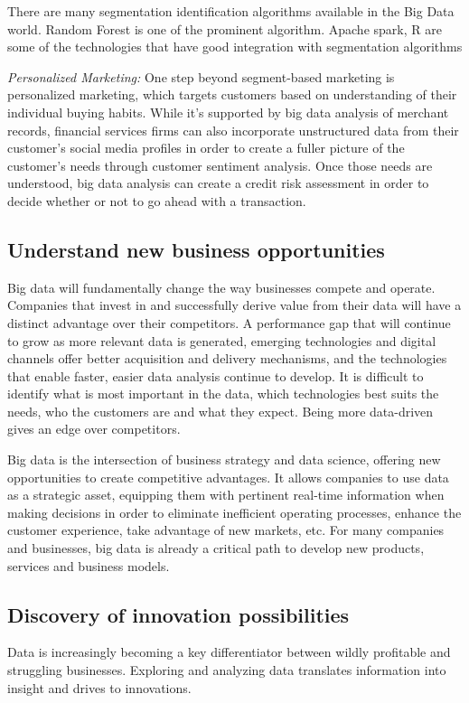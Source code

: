 \documentclass[sigconf]{acmart}
\begin{document}
There are many segmentation identification algorithms available in the Big Data world.  Random Forest is one of the prominent algorithm. Apache spark, R are some of the technologies that have good integration with segmentation algorithms

\textit{Personalized Marketing:} One step beyond segment-based marketing is personalized marketing, which targets customers based on understanding of their individual buying habits. While it's supported by big data analysis of merchant records, financial services firms can also incorporate unstructured data from their customer's social media profiles in order to create a fuller picture of the customer's needs through customer sentiment analysis. Once those needs are understood, big data analysis can create a credit risk assessment in order to decide whether or not to go ahead with a transaction\cite{5-big-data-use-cases-in-banking-and-financial-services}.

    
\subsection{Understand new business opportunities}
Big data will fundamentally change the way businesses
compete and operate. Companies that invest in and
successfully derive value from their data will have a distinct advantage over their competitors. A performance gap that will continue to grow as more relevant data is generated, emerging technologies and digital channels offer better acquisition and delivery mechanisms, and the technologies that enable faster, easier data analysis continue to develop. It is difficult to identify what is most important in the data, which technologies best suits the needs, who the customers are and what they expect. Being more data-driven gives an edge over competitors\cite{bigdata-ey}.

Big data is the intersection of business strategy and data science, offering new opportunities to create competitive advantages. It allows companies to use data as a strategic asset, equipping them with pertinent real-time information when making decisions in order to eliminate inefficient operating processes, enhance the customer experience, take advantage of new markets, etc.
For many companies and businesses, big data is already a critical path to develop new products, services and business models\cite{Accenture-Next-Generation-Financial}.

\subsection{Discovery of innovation possibilities}
Data is increasingly becoming a key differentiator between wildly profitable and struggling businesses. Exploring and analyzing data translates information into insight and drives to innovations\cite{bigdata-innovations}.
\end{document}
